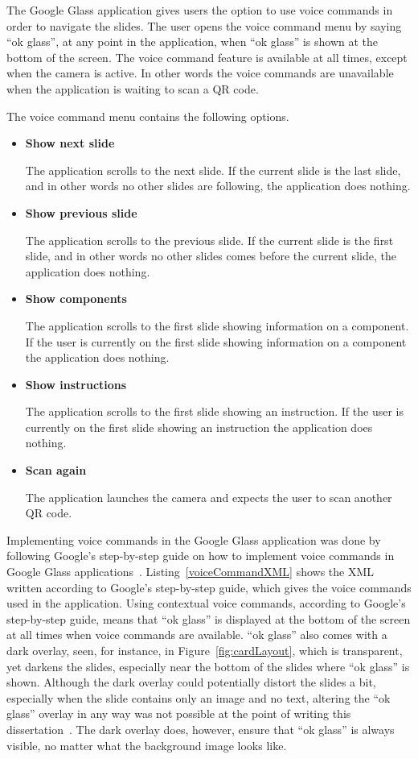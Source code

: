 The Google Glass application gives users the option to use voice commands in order to navigate the slides. The user opens the voice command menu by saying ``ok glass'', at any point in the application, when ``ok glass'' is shown at the bottom of the screen. The voice command feature is available at all times, except when the camera is active. In other words the voice commands are unavailable when the application is waiting to scan a QR code.

The voice command menu contains the following options.

\begin{itemize}
	\item \textbf{Show next slide}
	
	The application scrolls to the next slide. If the current slide is the last slide, and in other words no other slides are following, the application does nothing.
	\item \textbf{Show previous slide}
	
	The application scrolls to the previous slide. If the current slide is the first slide, and in other words no other slides comes before the current slide, the application does nothing.
	\item \textbf{Show components}
	
	The application scrolls to the first slide showing information on a component. If the user is currently on the first slide showing information on a component the application does nothing. 
	\item \textbf{Show instructions}
	
	The application scrolls to the first slide showing an instruction. If the user is currently on the first slide showing an instruction the application does nothing.
	\item \textbf{Scan again}
	
	The application launches the camera and expects the user to scan another QR code.
\end{itemize}

Implementing voice commands in the Google Glass application was done by following Google's step-by-step guide on how to implement voice commands in Google Glass applications~\cite{howToVoiceInput}. Listing~\ref{voiceCommandXML} shows the XML written according to Google's step-by-step guide, which gives the voice commands used in the application. Using contextual voice commands, according to Google's step-by-step guide, means that ``ok glass'' is displayed at the bottom of the screen at all times when voice commands are available. ``ok glass'' also comes with a dark overlay, seen, for instance, in Figure~\ref{fig:cardLayout}, which is transparent, yet darkens the slides, especially near the bottom of the slides where ``ok glass'' is shown. Although the dark overlay could potentially distort the slides a bit, especially when the slide contains only an image and no text, altering the ``ok glass'' overlay in any way was not possible at the point of writing this dissertation~\cite{voiceCommandCustom1, voiceCommandCustom2}. The dark overlay does, however, ensure that ``ok glass'' is always visible, no matter what the background image looks like.


